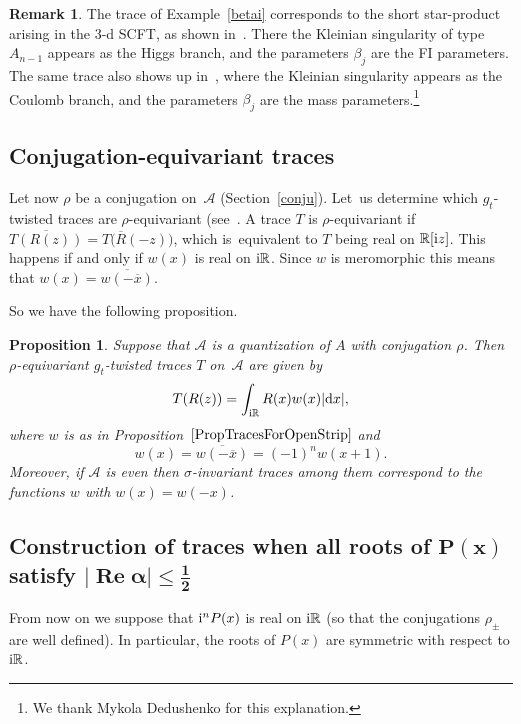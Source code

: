 \documentclass[10pt,a4paper]{amsart}
\newcommand{\RN}{\mathbb{R}} %
\newcommand{\ovl}{\overline}
\newcommand{\mc}[1]{\mathcal{#1}}
\renewcommand{\Re}{\operatorname{Re}}
\newtheorem{Proposition}[Theorem]{Proposition}
\theoremstyle{definition}
\newtheorem{Remark}[Theorem]{Remark}
\numberwithin{equation}{section}
\begin{document}
\begin{Remark} The trace of Example~\ref{betai} corresponds to the short star-product arising in the 3-d SCFT, as shown in~\cite[Section~8.1.2]{DPY}. There the Kleinian singularity of type $A_{n-1}$ appears as the Higgs branch, and the parameters $\beta_j$ are the FI parameters. The same trace also shows up in~\cite[equation~(5.27)]{DFPY}, where
the Kleinian singularity appears as the Coulomb branch, and the parameters $\beta_j$ are the mass parameters.\footnote{We thank Mykola Dedushenko for this explanation.}
\end{Remark}

\subsection{Conjugation-equivariant traces}
Let now $\rho$ be a conjugation on~$\mc A$ (Section~\ref{conju}). Let~us determine which $g_t$-twisted traces are $\rho$-equivariant (see~\cite[Section~3.6]{ES}. A trace $T$ is $\rho$-equivariant if $\ovl{T(R(z))}=T\big(\ovl{R}(-z)\big)$, which is~equivalent to $T$ being real on $\RN[{\rm i}z]$. This happens if and only if $w(x)$ is real on ${\rm i}\RN$. Since $w$ is meromorphic this means that $w(x)=\ovl{w(-\ovl{x})}$.

So we have the following proposition.

\begin{Proposition}
\label{PropQuaternionicTraces}
Suppose that $\mc{A}$ is a quantization of $A$ with conjugation $\rho$. Then $\rho$-equivariant $g_t$-twisted traces $T$ on~$\mc A$ are
given by
\[
T(R(z))=\int_{{\rm i}\RN} R(x)w(x)|{\rm d}x|,
\]
where $w$ is as in Proposition~$\ref{PropTracesForOpenStrip}$ and
\[w(x)=\ovl{w(-\ovl{x})}=(-1)^n w(x+1).
\]
Moreover, if $\mc A$ is even then $\sigma$-invariant traces among them
correspond to the functions $w$ with $w(x)=w(-x)$.
\end{Proposition}

\subsection[Construction of traces when all roots of P(x) satisfy |Re alpha| < 1/2]
{Construction of traces when all roots of $\boldsymbol{P(x)}$ satisfy $\boldsymbol{|\Re\alpha|\leq \frac{1}{2}}$}

From now on we suppose that ${\rm i}^nP(x)$ is real on ${\rm i}\RN$ (so that the conjugations $\rho_\pm$ are well defined). In particular, the roots of $P(x)$ are symmetric with respect to ${\rm i}\RN$.
\end{document}
